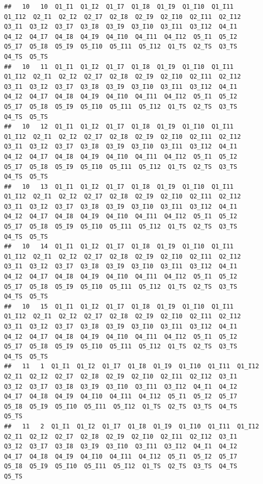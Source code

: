 \documentclass[
]{book}
\begin{document}
\begin{verbatim}
##   10   10  Q1_I1  Q1_I2  Q1_I7  Q1_I8  Q1_I9  Q1_I10  Q1_I11  Q1_I12  Q2_I1  Q2_I2  Q2_I7  Q2_I8  Q2_I9  Q2_I10  Q2_I11  Q2_I12  Q3_I1  Q3_I2  Q3_I7  Q3_I8  Q3_I9  Q3_I10  Q3_I11  Q3_I12  Q4_I1  Q4_I2  Q4_I7  Q4_I8  Q4_I9  Q4_I10  Q4_I11  Q4_I12  Q5_I1  Q5_I2  Q5_I7  Q5_I8  Q5_I9  Q5_I10  Q5_I11  Q5_I12  Q1_TS  Q2_TS  Q3_TS  Q4_TS  Q5_TS
##   10   11  Q1_I1  Q1_I2  Q1_I7  Q1_I8  Q1_I9  Q1_I10  Q1_I11  Q1_I12  Q2_I1  Q2_I2  Q2_I7  Q2_I8  Q2_I9  Q2_I10  Q2_I11  Q2_I12  Q3_I1  Q3_I2  Q3_I7  Q3_I8  Q3_I9  Q3_I10  Q3_I11  Q3_I12  Q4_I1  Q4_I2  Q4_I7  Q4_I8  Q4_I9  Q4_I10  Q4_I11  Q4_I12  Q5_I1  Q5_I2  Q5_I7  Q5_I8  Q5_I9  Q5_I10  Q5_I11  Q5_I12  Q1_TS  Q2_TS  Q3_TS  Q4_TS  Q5_TS
##   10   12  Q1_I1  Q1_I2  Q1_I7  Q1_I8  Q1_I9  Q1_I10  Q1_I11  Q1_I12  Q2_I1  Q2_I2  Q2_I7  Q2_I8  Q2_I9  Q2_I10  Q2_I11  Q2_I12  Q3_I1  Q3_I2  Q3_I7  Q3_I8  Q3_I9  Q3_I10  Q3_I11  Q3_I12  Q4_I1  Q4_I2  Q4_I7  Q4_I8  Q4_I9  Q4_I10  Q4_I11  Q4_I12  Q5_I1  Q5_I2  Q5_I7  Q5_I8  Q5_I9  Q5_I10  Q5_I11  Q5_I12  Q1_TS  Q2_TS  Q3_TS  Q4_TS  Q5_TS
##   10   13  Q1_I1  Q1_I2  Q1_I7  Q1_I8  Q1_I9  Q1_I10  Q1_I11  Q1_I12  Q2_I1  Q2_I2  Q2_I7  Q2_I8  Q2_I9  Q2_I10  Q2_I11  Q2_I12  Q3_I1  Q3_I2  Q3_I7  Q3_I8  Q3_I9  Q3_I10  Q3_I11  Q3_I12  Q4_I1  Q4_I2  Q4_I7  Q4_I8  Q4_I9  Q4_I10  Q4_I11  Q4_I12  Q5_I1  Q5_I2  Q5_I7  Q5_I8  Q5_I9  Q5_I10  Q5_I11  Q5_I12  Q1_TS  Q2_TS  Q3_TS  Q4_TS  Q5_TS
##   10   14  Q1_I1  Q1_I2  Q1_I7  Q1_I8  Q1_I9  Q1_I10  Q1_I11  Q1_I12  Q2_I1  Q2_I2  Q2_I7  Q2_I8  Q2_I9  Q2_I10  Q2_I11  Q2_I12  Q3_I1  Q3_I2  Q3_I7  Q3_I8  Q3_I9  Q3_I10  Q3_I11  Q3_I12  Q4_I1  Q4_I2  Q4_I7  Q4_I8  Q4_I9  Q4_I10  Q4_I11  Q4_I12  Q5_I1  Q5_I2  Q5_I7  Q5_I8  Q5_I9  Q5_I10  Q5_I11  Q5_I12  Q1_TS  Q2_TS  Q3_TS  Q4_TS  Q5_TS
##   10   15  Q1_I1  Q1_I2  Q1_I7  Q1_I8  Q1_I9  Q1_I10  Q1_I11  Q1_I12  Q2_I1  Q2_I2  Q2_I7  Q2_I8  Q2_I9  Q2_I10  Q2_I11  Q2_I12  Q3_I1  Q3_I2  Q3_I7  Q3_I8  Q3_I9  Q3_I10  Q3_I11  Q3_I12  Q4_I1  Q4_I2  Q4_I7  Q4_I8  Q4_I9  Q4_I10  Q4_I11  Q4_I12  Q5_I1  Q5_I2  Q5_I7  Q5_I8  Q5_I9  Q5_I10  Q5_I11  Q5_I12  Q1_TS  Q2_TS  Q3_TS  Q4_TS  Q5_TS
##   11   1  Q1_I1  Q1_I2  Q1_I7  Q1_I8  Q1_I9  Q1_I10  Q1_I11  Q1_I12  Q2_I1  Q2_I2  Q2_I7  Q2_I8  Q2_I9  Q2_I10  Q2_I11  Q2_I12  Q3_I1  Q3_I2  Q3_I7  Q3_I8  Q3_I9  Q3_I10  Q3_I11  Q3_I12  Q4_I1  Q4_I2  Q4_I7  Q4_I8  Q4_I9  Q4_I10  Q4_I11  Q4_I12  Q5_I1  Q5_I2  Q5_I7  Q5_I8  Q5_I9  Q5_I10  Q5_I11  Q5_I12  Q1_TS  Q2_TS  Q3_TS  Q4_TS  Q5_TS
##   11   2  Q1_I1  Q1_I2  Q1_I7  Q1_I8  Q1_I9  Q1_I10  Q1_I11  Q1_I12  Q2_I1  Q2_I2  Q2_I7  Q2_I8  Q2_I9  Q2_I10  Q2_I11  Q2_I12  Q3_I1  Q3_I2  Q3_I7  Q3_I8  Q3_I9  Q3_I10  Q3_I11  Q3_I12  Q4_I1  Q4_I2  Q4_I7  Q4_I8  Q4_I9  Q4_I10  Q4_I11  Q4_I12  Q5_I1  Q5_I2  Q5_I7  Q5_I8  Q5_I9  Q5_I10  Q5_I11  Q5_I12  Q1_TS  Q2_TS  Q3_TS  Q4_TS  Q5_TS

\end{verbatim}
\end{document}

